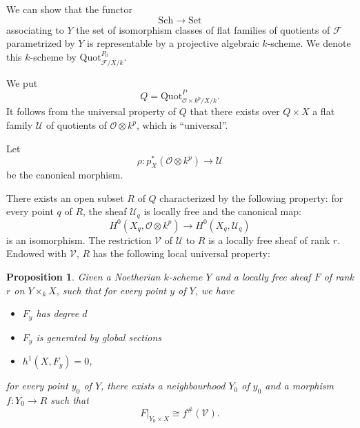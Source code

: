 \documentclass[12pt,a4paper]{book}
\def\FF{\mathscr{F}}
\def\OO{\mathscr{O}}
\def\Quot{\mathrm{Quot}}
\def\Sch{\mathrm{Sch}}
\def\Set{\mathrm{Set}}
\newtheorem{prop}[thm]{Proposition}
\theoremstyle{definition} \newtheorem{defn}[thm]{Definition}
\theoremstyle{definition} \newtheorem{ejs}[thm]{Examples}
\theoremstyle{definition} \newtheorem{ej}[thm]{Example}
\begin{document}
   We can show that the functor
   \begin{equation*}
     \Sch \longrightarrow \Set
   \end{equation*}
   associating to $Y$ the set of isomorphism classes of flat families of quotients of $\FF$ parametrized by $Y$ is representable by a projective  algebraic $k$-scheme. We denote this $k$-scheme by $\Quot^{P_0}_{\FF/X/k}$.

   We put
   \begin{equation*}
     Q=\Quot^P_{\OO \times k^p/X/k}.
   \end{equation*}
   It follows from the universal property of $Q$ that there exists over $Q\times X$ a flat family $\mathscr{U}$ of quotients of $\OO\otimes k^p$, which is ``universal''. 

   Let
   \begin{equation*}
     \rho:p^*_X(\OO\otimes k^p) \longrightarrow \mathscr{U}
   \end{equation*}
   be the canonical morphism.

   There exists an open subset $R$ of $Q$ characterized by the following property: for every point $q$ of $R$, the sheaf $\mathscr{U}_q$ is locally free and the canonical map:
   \begin{equation*}
     H^0(X_q,\OO\otimes k^p) \longrightarrow H^0(X_q,\mathscr{U}_q)
   \end{equation*}
   is an isomorphism. The restriction $\mathscr{V}$ of $\mathscr{U}$ to $R$ is a locally free sheaf of rank $r$. Endowed with $\mathscr{V}$, $R$ has the following local universal property:
   \begin{prop}\label{1.21}
     Given a Noetherian $k$-scheme $Y$ and a locally free sheaf $F$ of rank $r$ on $Y\times_k X$, such that for every point $y$ of $Y$, we have
     \begin{itemize}
       \item[\rm (i)] $F_y$ has degree $d$
\item[\rm (ii)] $F_y$ is generated by global sections
\item[\rm (iii)] $h^1(X,F_y)=0$,
     \end{itemize}
     for every point $y_0$ of $Y$, there exists a neighbourhood $Y_0$ of $y_0$ and a morphism $f:Y_0 \rightarrow R$ such that
     \begin{equation*}
       F|_{Y_0 \times X} \cong f^{\#}(\mathscr{V}).
     \end{equation*}
   \end{prop}
\end{document}
